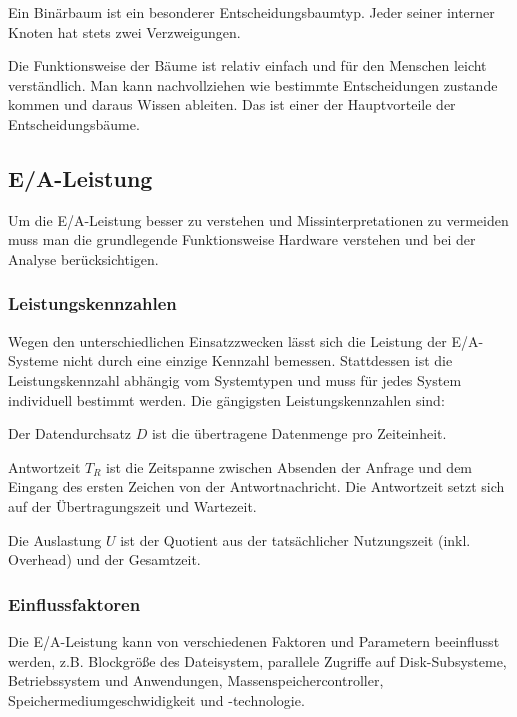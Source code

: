 Ein Binärbaum ist ein besonderer Entscheidungsbaumtyp. 
Jeder seiner interner Knoten hat stets zwei Verzweigungen. 

Die Funktionsweise der Bäume ist relativ einfach und für den Menschen leicht verständlich. 
Man kann nachvollziehen wie bestimmte Entscheidungen zustande kommen und daraus Wissen ableiten. 
Das ist einer der Hauptvorteile der Entscheidungsbäume.


\subsection{E/A-Leistung}
Um die E/A-Leistung besser zu verstehen und Missinterpretationen zu vermeiden muss man die grundlegende Funktionsweise Hardware verstehen und bei der Analyse berücksichtigen. 

\subsubsection{Leistungskennzahlen}
Wegen den unterschiedlichen Einsatzzwecken lässt sich die Leistung der E/A-Systeme nicht durch eine einzige Kennzahl bemessen. 
Stattdessen ist die Leistungskennzahl abhängig vom Systemtypen und muss für jedes System individuell bestimmt werden. 
Die gängigsten Leistungskennzahlen sind:

\begin{term}[Datendurchsatz] %
	Der Datendurchsatz $D$ ist die übertragene Datenmenge pro Zeiteinheit.
\end{term}

\begin{term}[Antwortzeit]
	Antwortzeit $T_R$ ist die Zeitspanne zwischen Absenden der Anfrage und dem Eingang des ersten Zeichen von der Antwortnachricht. Die Antwortzeit setzt sich auf der Übertragungszeit und Wartezeit.
\end{term}

\begin{term}[Auslastung]
	Die Auslastung $U$ ist der Quotient aus der tatsächlicher Nutzungszeit (inkl. Overhead) und der Gesamtzeit. 
\end{term}


\subsubsection{Einflussfaktoren}
Die E/A-Leistung kann von verschiedenen Faktoren und Parametern beeinflusst werden, z.B. Blockgröße des Dateisystem, parallele Zugriffe auf Disk-Subsysteme, Betriebssystem und Anwendungen, Massenspeichercontroller, Speichermediumgeschwidigkeit und -technologie.

